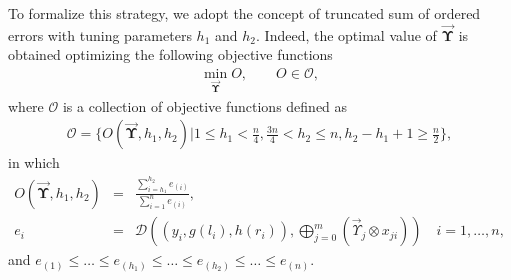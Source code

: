 \documentclass{IJFS}
\begin{document}
To formalize this strategy, we adopt the concept of truncated sum of ordered errors with tuning parameters $h_1$ and $h_2$.
Indeed, the optimal value of $\vec{\boldsymbol{\Upsilon}}$ is obtained optimizing the following objective functions
\begin{eqnarray}\label{M4}
  \min_{\vec{\boldsymbol{\Upsilon}}} O, \qquad O \in \mathcal{O},
\end{eqnarray}
where $\mathcal{O}$ is a collection of objective functions defined as
\begin{eqnarray*}
  \mathcal{O}  =  \Big\{O(\vec{\boldsymbol{\Upsilon}},h_1,h_2) | 1 \leq h_1 < \frac{n}{4}, \frac{3n}{4} <h_2 \leq n, h_2-h_1+1\geq \frac{n}{2} \Big\},
\end{eqnarray*}
in which
\begin{eqnarray*}
O(\vec{\boldsymbol{\Upsilon}},h_1,h_2)&=&\frac{\sum_{i=h_1}^{h_2} e_{(i)}}{\sum_{i=1}^{n} e_{(i)}},\\
e_i &=& \mathcal{D}\left((y_i,g(l_i),h(r_i)), \bigoplus_{j=0}^m(\vec{\Upsilon}_j\otimes x_{ji})\right) \quad i=1,\ldots,n,
\end{eqnarray*}
and
$e_{(1)} \leq \ldots\leq e_{(h_1)} \leq \ldots \leq e_{(h_2)}\leq\ldots\leq e_{(n)}$.
\end{document}
